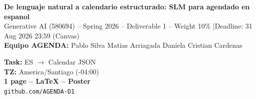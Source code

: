 \documentclass[a4paper,10pt]{article}
\begin{document}
\pagestyle{empty}

\begin{tcolorbox}[colback=agendaBlue,colframe=agendaBlue,arc=3pt,boxrule=0pt,left=4pt,right=4pt,top=4pt,bottom=4pt]
\begin{minipage}[c]{0.74\textwidth}
{\color{white}\bfseries\large De lenguaje natural a calendario estructurado: SLM para agendado en espanol}\\[1pt]
{\color{white!90}\footnotesize Generative AI (580694) -- Spring 2026 -- Deliverable 1 -- Weight 10\% \quad|\quad Deadline: 31 Aug 2026 23:59 (Canvas)}\\[2pt]
{\color{white}\footnotesize \textbf{Equipo AGENDA:} Pablo Silva \textbar{} Matias Arriagada \textbar{} Daniela \textbar{} Cristian Cardenas}
\end{minipage}%
\begin{minipage}[c]{0.26\textwidth}
\raggedleft
{\color{white!85}\scriptsize \textbf{Task:} ES $\rightarrow$ Calendar JSON}\\
{\color{white!85}\scriptsize \textbf{TZ:} America/Santiago (-04:00)}\\
{\color{white!85}\scriptsize \textbf{1 page -- LaTeX -- Poster}}\\
{\color{white}\scriptsize \texttt{github.com/AGENDA-D1}}
\end{minipage}
\end{tcolorbox}
\vspace{3pt}
\end{document}
